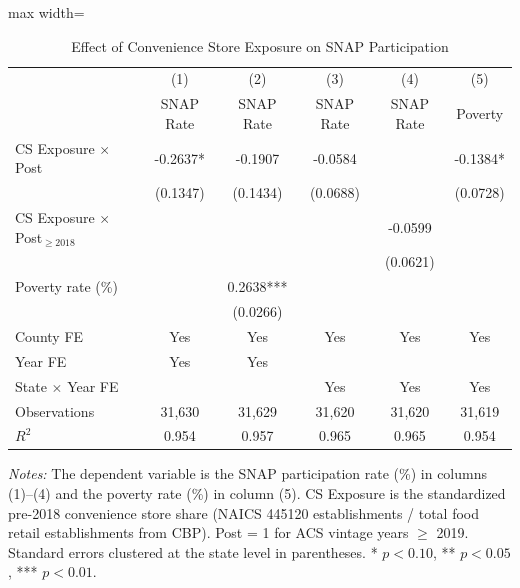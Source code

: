 \begin{table}[htbp]
\centering
\caption{Effect of Convenience Store Exposure on SNAP Participation}
\label{tab:main}
\begin{adjustbox}{max width=\textwidth}
\begin{tabular}{lccccc}
\toprule
 & (1) & (2) & (3) & (4) & (5) \\
 & SNAP Rate & SNAP Rate & SNAP Rate & SNAP Rate & Poverty \\
\midrule
CS Exposure $\times$ Post & -0.2637* & -0.1907 & -0.0584 & & -0.1384* \\
 & (0.1347) & (0.1434) & (0.0688) & & (0.0728) \\
CS Exposure $\times$ Post$_{\geq 2018}$ & & & & -0.0599 & \\
 & & & & (0.0621) & \\
Poverty rate (\%) & & 0.2638*** & & & \\
 & & (0.0266) & & & \\
\midrule
County FE & Yes & Yes & Yes & Yes & Yes \\
Year FE & Yes & Yes & & & \\
State $\times$ Year FE & & & Yes & Yes & Yes \\
\midrule
Observations & 31,630 & 31,629 & 31,620 & 31,620 & 31,619 \\
$R^2$ & 0.954 & 0.957 & 0.965 & 0.965 & 0.954 \\
\bottomrule
\end{tabular}
\end{adjustbox}
\begin{tablenotes}[flushleft]
\small
\item \textit{Notes:} The dependent variable is the SNAP participation rate (\%) in columns (1)--(4) and the poverty rate (\%) in column (5). CS Exposure is the standardized pre-2018 convenience store share (NAICS 445120 establishments / total food retail establishments from CBP). Post = 1 for ACS vintage years $\geq$ 2019. Standard errors clustered at the state level in parentheses. * $p<0.10$, ** $p<0.05$, *** $p<0.01$.
\end{tablenotes}
\end{table}


